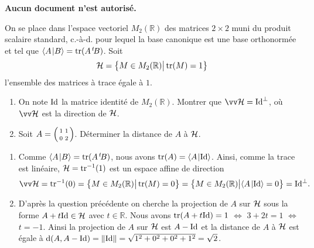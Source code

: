 \documentclass[a4paper,12pt,reqno]{amsart}
\begin{document}
\ifsolutions\else
\textbf{Aucun document n'est autorisé.}

\vspace{14mm}
\fi

\begin{exo}

  On se place dans l'espace vectoriel $M_2(\mathbb{R})$ des matrices $2\times 2$ muni du produit scalaire standard, c.-à-d. pour lequel la base canonique est une base orthonormée et tel que $\langle{A}\kern1pt |{B}\rangle = \operatorname{tr}(A^{\,t}\!B)$. Soit
  $$
    \mathcal{H}=\big\{ M \in M_2(\mathbb{R}) \big| \operatorname{tr}(M)=1 \big\}
  $$
  l'ensemble des matrices à trace égale à $1$.
  \begin{enumerate}
    \item On note $\mathrm{Id}$ la matrice identité de $M_2(\mathbb{R})$. Montrer que $\ev{H} = \id^{\perp}$, où $\ev{H}$ est la direction de $\mathcal{H}$.
    \item Soit $A = \begin{psmallmatrix} 1 & 1\\[3pt] 0 & 2 \end{psmallmatrix}$. Déterminer la distance de $A$ à $\mathcal{H}$.

  \end{enumerate}

\end{exo}

\begin{solution}

  \begin{enumerate}
    \item Comme $\langle{A}\kern1pt |{B}\rangle=\operatorname{tr}(A^{\,t}\!B)$, nous avons $\operatorname{tr}(A) = \langle{A}\kern1pt |{\mathrm{Id}}\rangle$. Ainsi, comme la trace est linéaire, $\mathcal{H}=\operatorname{tr}^{-1}(1)$ est un espace affine de direction
      $$
        \ev{H} = \tr^{-1}(0) = \big\{ M \in M_2(\mathbb{R}) \big| \tr(M)=0 \big\} = \big\{ M \in M_2(\mathbb{R}) \big| \scalprod{A}{\id}=0 \big\} = \id^{\perp}.
      $$
    \item D'après la question précédente on cherche la projection de $A$ sur $\mathcal{H}$ sous la forme $A+t\mathrm{Id} \in \mathcal{H}$ avec $t \in \mathbb{R}$. Nous avons $\operatorname{tr}(A+t\mathrm{Id})=1$ $\Leftrightarrow$ $3+2t=1$ $\Leftrightarrow$ $t=-1$. Ainsi la projection de $A$ sur $\mathcal{H}$ est $A-\mathrm{Id}$ et la distance de $A$ à $\mathcal{H}$ est égale à $\operatorname{d}(A,A-\mathrm{Id})=\left\|\mathrm{Id}\right\|=\sqrt{1^{2}+0^{2}+0^{2}+1^{2}} = \sqrt{2}$.\\[7pt]
      \begin{center}
        
      \end{center}
  \end{enumerate}
\end{solution}
\end{document}
